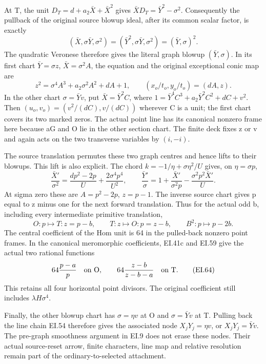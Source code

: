 At T, the unit \(D_T=d+a_2\bar X+\bar X^2\) gives
\(\bar X D_T=\bar Y^2-\sigma^2\). Consequently the pullback
of the original source blowup ideal, after its common scalar factor,
is exactly
\[
 (\bar X,\sigma\bar Y,\sigma^2)
       =(\bar Y^2,\sigma\bar Y,\sigma^2)
       =(\bar Y,\sigma)^2.
 \tag{EI.60}
\]
The quadratic Veronese therefore gives the literal graph blowup
\((\bar Y,\sigma)\). In its first chart
\(\bar Y=\sigma z\), \(\bar X=\sigma^2 A\), the equation and
the original exceptional conic map are
\[
 z^2=\sigma^4A^3+a_2\sigma^2A^2+dA+1,
 \qquad (x_o/t_o,y_o/t_o)=(dA,z).
 \tag{EI.61}
\]
In the other chart \(\sigma=\bar Yv\), put
\(\bar X=\bar Y^2C\), where
\(1=\bar Y^4C^3+a_2\bar Y^2C^2+dC+v^2\).
Then \((u_o,v_o)=(v^2/(dC),v/(dC))\) wherever C is a unit;
the first chart covers its two marked zeros. The actual point line
has its canonical nonzero frame here because aG and O lie in the
other section chart. The finite deck fixes z or v and again acts
on the two transverse variables by \((i,-i)\).

The source translation permutes these two graph centres and hence
lifts to their blowups. This lift is also explicit. The chord
\(k=-1/\eta+\sigma\eta^2/U\) gives, on \(\eta=\sigma p\),
\[
 \frac{\bar X'}{\sigma^2}
  =\frac{dp^2-2p}{U}+\frac{2\sigma^4p^4}{U^2},\qquad
 \frac{\bar Y'}{\sigma}
  =1+\frac{\bar X'}{\sigma^2p}
       -\frac{\sigma^2p^2\bar X'}{U}.
 \tag{EI.62}
\]
At sigma zero these are \(A=p^2-2p\), \(z=p-1\).
The inverse source chart gives p equal to z minus one for the next
forward translation. Thus for the actual odd b, including every
intermediate primitive translation,
\[
 O:p\longmapsto T:z=p-b,\qquad
 T:z\longmapsto O:p=z-b,
 \qquad B^2:p\longmapsto p-2b.
 \tag{EI.63}
\]
The central coefficient of the Hom unit is 64 in the pulled-back
nonzero point frames. In the canonical meromorphic coefficients,
EI.41c and EI.59 give the actual two rational functions
\[
 64\frac{p-a}{p}\quad\hbox{on O},\qquad
 64\frac{z-b}{z-b-a}\quad\hbox{on T}.
 \tag{EI.64}
\]
This retains all four horizontal point divisors. The original
coefficient still includes \(\lambda H\sigma^4\).

Finally, the other blowup chart has \(\sigma=\eta v\) at O
and \(\sigma=\bar Yv\) at T. Pulling back the line chain EI.54
therefore gives the associated node \(X_jY_j=\eta v\), or
\(X_jY_j=\bar Yv\). The pre-graph smoothness argument in EI.9
does not erase these nodes. Their actual source-reset arrow,
finite characters, line map and relative resolution remain part
of the ordinary-to-selected attachment.

